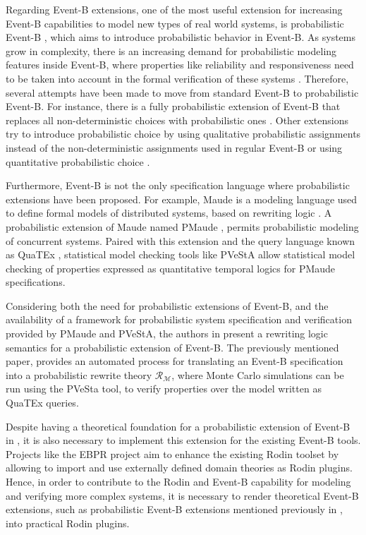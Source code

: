 Regarding Event-B extensions, one of the most useful extension for increasing Event-B capabilities to model new types of real world systems, is probabilistic Event-B \cite{Morgan2005}, which aims to introduce probabilistic behavior in Event-B. As systems grow in complexity, there is an increasing demand for probabilistic modeling features inside Event-B, where properties like reliability and responsiveness need to be taken into account in the formal verification of these systems \cite{Aouadhi2017}. Therefore, several attempts have been made to move from standard Event-B to probabilistic Event-B. For instance, there is a fully probabilistic extension of Event-B that replaces all non-deterministic choices with probabilistic ones \cite{Aouadhi2017}. Other extensions try to introduce probabilistic choice by using qualitative probabilistic assignments instead of the non-deterministic assignments used in regular Event-B \cite{Hallerstede2007} or using quantitative probabilistic choice \cite{Tarasyuk2010}.

Furthermore, Event-B is not the only specification language where probabilistic extensions have been proposed. For example, Maude \cite{Clavel2007} is a modeling language used to define formal models of distributed systems, based on rewriting logic \cite{Bruni2006}. A probabilistic extension of Maude named PMaude \cite{Agha2006}, permits probabilistic modeling of concurrent systems. Paired with this extension and the query language known as QuaTEx \cite{Agha2006}, statistical model checking tools like PVeStA \cite{AlTurki2011} allow statistical model checking of properties expressed as quantitative temporal logics for PMaude specifications.

Considering both the need for probabilistic extensions of Event-B, and the availability of a framework for probabilistic system specification and verification provided by PMaude and PVeStA,  the authors in \cite{Olarte} present a rewriting logic semantics for a probabilistic extension of Event-B. The previously mentioned paper, provides an automated process for translating an Event-B specification into a probabilistic rewrite theory $\mathscr{R}_\mathscr{M}$, where Monte Carlo simulations can be run using the PVeSta tool, to verify properties over the model written as QuaTEx queries.

Despite having a theoretical foundation for a probabilistic extension of Event-B in \cite{Olarte}, it is also necessary to implement this extension for the existing Event-B tools. Projects like the EBPR project \cite{EBRP} aim to enhance the existing Rodin toolset by allowing to import and use externally defined domain theories as Rodin plugins. Hence, in order to contribute to the Rodin and Event-B capability for modeling and verifying more complex systems, it is necessary to render theoretical Event-B extensions, such as probabilistic Event-B extensions mentioned previously in \cite{Olarte}, into practical Rodin plugins.